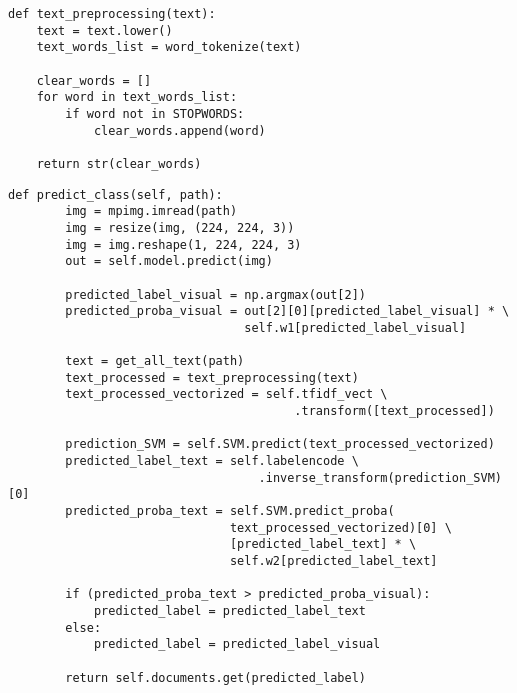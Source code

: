 \begin{lstlisting}[caption=Предобработка текста., label = lst:text, style=realcode]
def text_preprocessing(text):
    text = text.lower()
    text_words_list = word_tokenize(text)

    clear_words = []
    for word in text_words_list:
        if word not in STOPWORDS:
            clear_words.append(word)

    return str(clear_words)
\end{lstlisting}

\begin{lstlisting}[caption=Ансамбль классификаторов., label = lst:concat, style=realcode]
def predict_class(self, path):
        img = mpimg.imread(path)
        img = resize(img, (224, 224, 3))
        img = img.reshape(1, 224, 224, 3)
        out = self.model.predict(img)

        predicted_label_visual = np.argmax(out[2])
        predicted_proba_visual = out[2][0][predicted_label_visual] * \
                                 self.w1[predicted_label_visual]

        text = get_all_text(path)
        text_processed = text_preprocessing(text)
        text_processed_vectorized = self.tfidf_vect \
                                        .transform([text_processed])

        prediction_SVM = self.SVM.predict(text_processed_vectorized)
        predicted_label_text = self.labelencode \
                                   .inverse_transform(prediction_SVM)[0]
        predicted_proba_text = self.SVM.predict_proba(
                               text_processed_vectorized)[0] \
                               [predicted_label_text] * \
                               self.w2[predicted_label_text]

        if (predicted_proba_text > predicted_proba_visual):
            predicted_label = predicted_label_text
        else:
            predicted_label = predicted_label_visual

        return self.documents.get(predicted_label)
\end{lstlisting}
